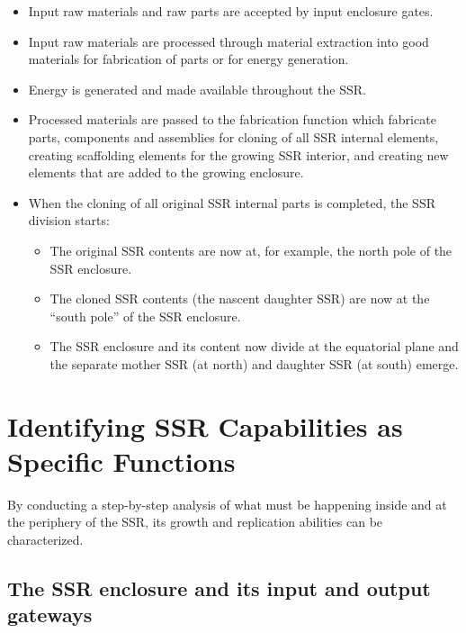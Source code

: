 \begin{itemize}
\item Input raw materials and raw parts are accepted by input enclosure
gates.
\item Input raw materials are processed through material extraction into
good materials for fabrication of parts or for energy generation.
\item Energy is generated and made available throughout the SSR.
\item Processed materials are passed to the fabrication function which fabricate parts, components and
assemblies for cloning of all SSR internal elements, creating scaffolding elements for the growing SSR interior, and creating new elements that are added to the growing enclosure.
\item When the cloning of all original SSR internal parts is completed,
the SSR division starts:

\begin{itemize}
\item The original SSR contents are now at, for example, the north pole
of the SSR enclosure.
\item The cloned SSR contents (the nascent daughter SSR) are now at the
“south pole” of the SSR enclosure.
\item The SSR enclosure and its content now divide at the equatorial
plane and the separate mother SSR (at north) and daughter SSR (at south)
emerge.
\end{itemize}
\end{itemize}

\section{Identifying SSR Capabilities as Specific Functions}

By conducting a step-by-step analysis of what must be happening inside and at
the periphery of the SSR, its growth and replication abilities can be characterized.

\subsection[The SSR enclosure and its input and output gateways]{The SSR enclosure and its input and output gateways}

